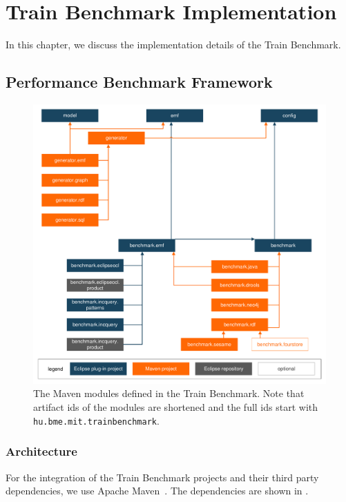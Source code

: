 \chapter{Train Benchmark Implementation}

In this chapter, we discuss the implementation details of the Train Benchmark.

\section{Performance Benchmark Framework}

\begin{figure}[!Htb]
	\centering
	\includegraphics[width=\textwidth]{figures/trainbenchmark-modules}
	\caption{The Maven modules defined in the Train Benchmark. Note that artifact ids of the modules are shortened and the full ids start with \texttt{hu.bme.mit.trainbenchmark}.}
	\label{fig:trainbenchmark-modules}
\end{figure}

\subsection{Architecture}

For the integration of the Train Benchmark projects and their third party dependencies, we use Apache Maven~\cite{Maven}. The dependencies are shown in .

